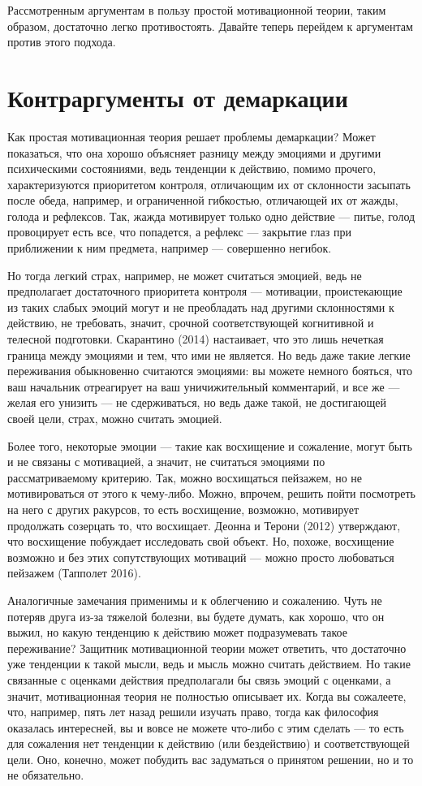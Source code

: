 \documentclass[11pt]{book}
\begin{document}
Рассмотренным аргументам в пользу простой мотивационной теории, таким образом, достаточно легко противостоять. Давайте теперь перейдем к аргументам против этого подхода.

\section{Контраргументы от демаркации}

Как простая мотивационная теория решает проблемы демаркации? Может показаться, что она хорошо объясняет разницу между эмоциями и другими психическими состояниями, ведь тенденции к действию, помимо прочего, характеризуются приоритетом контроля, отличающим их от склонности засыпать после обеда, например, и ограниченной гибкостью, отличающей их от жажды, голода и рефлексов. Так, жажда мотивирует только одно действие --- питье, голод провоцирует есть все, что попадется, а рефлекс --- закрытие глаз при приближении к ним предмета, например --- совершенно негибок.

Но тогда легкий страх, например, не может считаться эмоцией, ведь не предполагает достаточного приоритета контроля --- мотивации, проистекающие из таких слабых эмоций могут и не преобладать над другими склонностями к действию, не требовать, значит, срочной соответствующей когнитивной и телесной подготовки. Скарантино (2014) настаивает, что это лишь нечеткая граница между эмоциями и тем, что ими не является. Но ведь даже такие легкие переживания обыкновенно считаются эмоциями: вы можете немного бояться, что ваш начальник отреагирует на ваш уничижительный комментарий, и все же --- желая его унизить --- не сдерживаться, но ведь даже такой, не достигающей своей цели, страх, можно считать эмоцией.

Более того, некоторые эмоции --- такие как восхищение и сожаление, могут быть и не связаны с мотивацией, а значит, не считаться эмоциями по рассматриваемому критерию. Так, можно восхищаться пейзажем, но не мотивироваться от этого к чему-либо. Можно, впрочем, решить пойти посмотреть на него с других ракурсов, то есть восхищение, возможно, мотивирует продолжать созерцать то, что восхищает. Деонна и Терони (2012) утверждают, что восхищение побуждает исследовать свой объект. Но, похоже, восхищение возможно и без этих сопутствующих мотиваций --- можно просто любоваться пейзажем (Тапполет 2016).

Аналогичные замечания применимы и к облегчению и сожалению. Чуть не потеряв друга из-за тяжелой болезни, вы будете думать, как хорошо, что он выжил, но какую тенденцию к действию может подразумевать такое переживание? Защитник мотивационной теории может ответить, что достаточно уже тенденции к такой мысли, ведь и мысль можно считать действием. Но такие связанные с оценками действия предполагали бы связь эмоций с оценками, а значит, мотивационная теория не полностью описывает их. Когда вы сожалеете, что, например, пять лет назад решили изучать право, тогда как философия оказалась интересней, вы и вовсе не можете что-либо с этим сделать --- то есть для сожаления нет тенденции к действию (или бездействию) и соответствующей цели. Оно, конечно, может побудить вас задуматься о принятом решении, но и то не обязательно.
\end{document}
